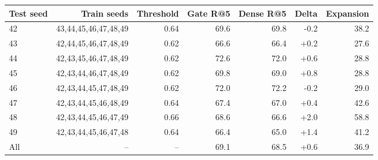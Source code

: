 \begin{tabular}{lrrrrrr}
\toprule
Test seed & Train seeds & Threshold & Gate R@5 & Dense R@5 & Delta & Expansion \\
\midrule
42 & 43,44,45,46,47,48,49 & 0.64 & 69.6 & 69.8 & -0.2 & 38.2 \\
43 & 42,44,45,46,47,48,49 & 0.62 & 66.6 & 66.4 & +0.2 & 27.6 \\
44 & 42,43,45,46,47,48,49 & 0.62 & 72.6 & 72.0 & +0.6 & 28.8 \\
45 & 42,43,44,46,47,48,49 & 0.62 & 69.8 & 69.0 & +0.8 & 28.8 \\
46 & 42,43,44,45,47,48,49 & 0.62 & 72.0 & 72.2 & -0.2 & 29.0 \\
47 & 42,43,44,45,46,48,49 & 0.64 & 67.4 & 67.0 & +0.4 & 42.6 \\
48 & 42,43,44,45,46,47,49 & 0.66 & 68.6 & 66.6 & +2.0 & 58.8 \\
49 & 42,43,44,45,46,47,48 & 0.64 & 66.4 & 65.0 & +1.4 & 41.2 \\
\midrule
All & -- & -- & 69.1 & 68.5 & +0.6 & 36.9 \\
\bottomrule
\end{tabular}
